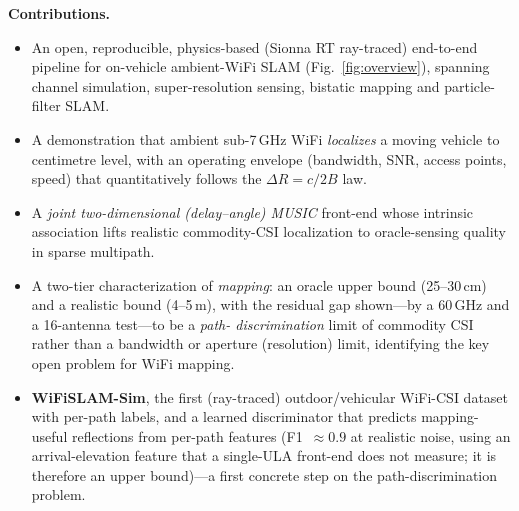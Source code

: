 \documentclass[journal]{IEEEtran}
\newcommand{\SI}[2]{#1\,#2}
\newcommand{\SIrange}[3]{#1--#2\,#3}
\begin{document}
\textbf{Contributions.}
\begin{itemize}
\item An open, reproducible, physics-based (Sionna RT ray-traced) end-to-end
pipeline for on-vehicle ambient-WiFi SLAM (Fig.~\ref{fig:overview}), spanning channel
simulation, super-resolution sensing, bistatic mapping and particle-filter SLAM.
\item A demonstration that ambient sub-\SI{7}{GHz} WiFi \emph{localizes} a moving
vehicle to centimetre level, with an operating envelope (bandwidth, SNR, access
points, speed) that quantitatively follows the $\Delta R=c/2B$ law.
\item A \emph{joint two-dimensional (delay--angle) MUSIC} front-end whose intrinsic
association lifts realistic commodity-CSI localization to oracle-sensing quality
in sparse multipath.
\item A two-tier characterization of \emph{mapping}: an oracle upper bound
(\SIrange{25}{30}{cm}) and a realistic bound (\SIrange{4}{5}{m}), with the residual
gap shown---by a \SI{60}{GHz} and a 16-antenna test---to be a \emph{path-
discrimination} limit of commodity CSI rather than a bandwidth or aperture
(resolution) limit, identifying the key open problem for WiFi mapping.
\item \textbf{WiFiSLAM-Sim}, the first (ray-traced) outdoor/vehicular WiFi-CSI
dataset with per-path labels, and a learned discriminator that predicts
mapping-useful reflections from per-path features (F1~$\approx0.9$ at realistic noise,
using an arrival-elevation feature that a single-ULA front-end does not measure; it is
therefore an upper bound)---a first concrete step on the path-discrimination problem.
\end{itemize}
\end{document}
